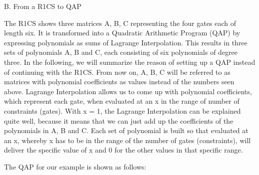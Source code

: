 B. From a R1CS to QAP

The R1CS shows three matrices A, B, C representing the four gates each of length six. It is transformed into a Quadratic Arithmetic Program (QAP) by expressing polynomials as sums of Lagrange Interpolation. This results in three sets of polynomials A, B and C, each consisting of six polynomials of degree three. In the following, we will summarize the reason of setting up a QAP instead of continuing with the R1CS. From now on, A, B, C will be referred to as matrices with polynomial coefficients as values instead of the numbers seen above. Lagrange Interpolation allows us to come up with polynomial coefficients, which represent each gate, when evaluated at an x in the range of number of constraints (gates). With x = 1, the Lagrange Interpolation can be explained quite well, because it means that we can just add up the coefficients of the polynomials in A, B and C. Each set of polynomial is built so that evaluated at an x, whereby x has to be in the range of the number of gates (constraints), will deliver the specific value of x and 0 for the other values in that specific range.

The QAP for our example is shown as follows:


